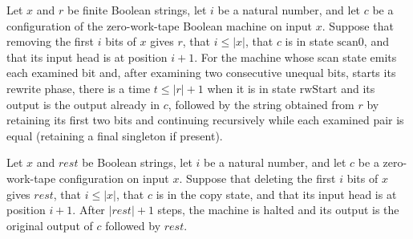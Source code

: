 \begin{theorem}
\label{Complexity.TimeHierarchy.pre_scan}
\leanok
{}
Let $x$ and $r$ be finite Boolean strings, let $i$ be a natural number, and let $c$ be a
configuration of the zero-work-tape Boolean machine on input $x$. Suppose that removing
the first $i$ bits of $x$ gives $r$, that $i\leq |x|$, that $c$ is in state
$\mathrm{scan0}$, and that its input head is at position $i+1$. For the machine whose
scan state emits each examined bit and, after examining two consecutive unequal bits,
starts its rewrite phase, there is a time $t\leq |r|+1$ when it is in state
$\mathrm{rwStart}$ and its output is the output already in $c$, followed by the string
obtained from $r$ by retaining its first two bits and continuing recursively while each
examined pair is equal (retaining a final singleton if present).
\end{theorem}

\begin{theorem}
\label{Complexity.TimeHierarchy.pre_copy}
\leanok
{}
Let $x$ and $rest$ be Boolean strings, let $i$ be a natural number, and let $c$ be a
zero-work-tape configuration on input $x$. Suppose that deleting the first $i$ bits of
$x$ gives $rest$, that $i\leq |x|$, that $c$ is in the copy state, and that its input
head is at position $i+1$. After $|rest|+1$ steps, the machine is halted and its output
is the original output of $c$ followed by $rest$.
\end{theorem}


